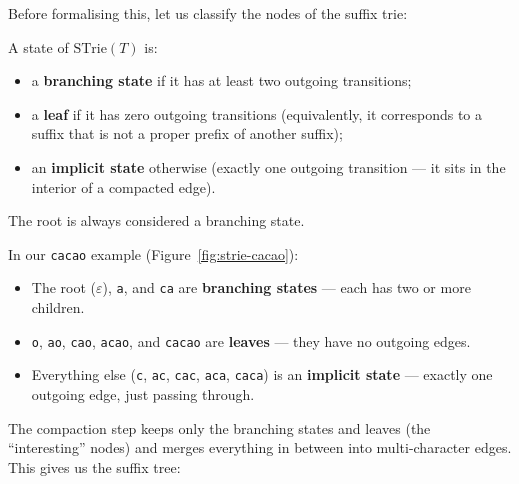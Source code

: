 Before formalising this, let us classify the nodes of the suffix trie:

\begin{definition}
  A state of $\mathrm{STrie}(T)$ is:
  \begin{itemize}[nosep]
    \item a \textbf{branching state} if it has at least two outgoing
          transitions;
    \item a \textbf{leaf} if it has zero outgoing transitions
          (equivalently, it corresponds to a suffix that is not a proper
          prefix of another suffix);
    \item an \textbf{implicit state} otherwise (exactly one outgoing
          transition --- it sits in the interior of a compacted edge).
  \end{itemize}
  The root is always considered a branching state.
\end{definition}

In our \texttt{cacao} example (Figure~\ref{fig:strie-cacao}):
\begin{itemize}[nosep]
  \item The root ($\varepsilon$), \texttt{a}, and \texttt{ca} are
        \textbf{branching states} --- each has two or more children.
  \item \texttt{o}, \texttt{ao}, \texttt{cao}, \texttt{acao}, and
        \texttt{cacao} are \textbf{leaves} --- they have no outgoing
        edges.
  \item Everything else (\texttt{c}, \texttt{ac}, \texttt{cac},
        \texttt{aca}, \texttt{caca}) is an \textbf{implicit state} ---
        exactly one outgoing edge, just passing through.
\end{itemize}

The compaction step keeps only the branching states and leaves (the
``interesting'' nodes) and merges everything in between into
multi-character edges.
This gives us the suffix tree:


